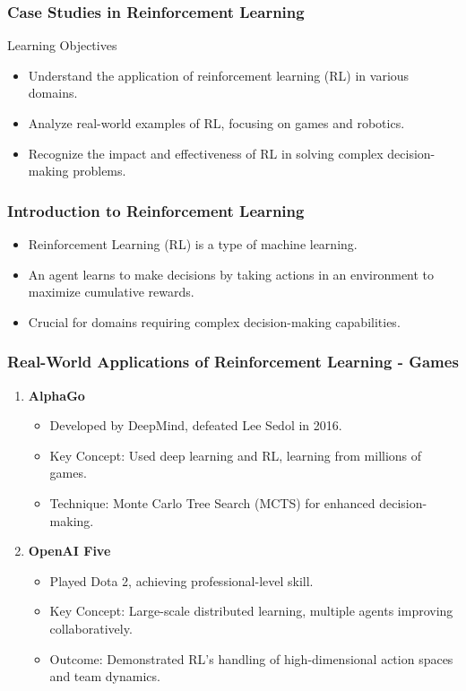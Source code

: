 \documentclass[aspectratio=169]{beamer}
\begin{document}
\begin{frame}[fragile]
    \frametitle{Case Studies in Reinforcement Learning}
    \begin{block}{Learning Objectives}
        \begin{itemize}
            \item Understand the application of reinforcement learning (RL) in various domains.
            \item Analyze real-world examples of RL, focusing on games and robotics.
            \item Recognize the impact and effectiveness of RL in solving complex decision-making problems.
        \end{itemize}
    \end{block}
\end{frame}

\begin{frame}[fragile]
    \frametitle{Introduction to Reinforcement Learning}
    \begin{itemize}
        \item Reinforcement Learning (RL) is a type of machine learning.
        \item An agent learns to make decisions by taking actions in an environment to maximize cumulative rewards.
        \item Crucial for domains requiring complex decision-making capabilities.
    \end{itemize}
\end{frame}

\begin{frame}[fragile]
    \frametitle{Real-World Applications of Reinforcement Learning - Games}
    \begin{enumerate}
        \item \textbf{AlphaGo}
        \begin{itemize}
            \item Developed by DeepMind, defeated Lee Sedol in 2016.
            \item Key Concept: Used deep learning and RL, learning from millions of games.
            \item Technique: Monte Carlo Tree Search (MCTS) for enhanced decision-making.
        \end{itemize}

        \item \textbf{OpenAI Five}
        \begin{itemize}
            \item Played Dota 2, achieving professional-level skill.
            \item Key Concept: Large-scale distributed learning, multiple agents improving collaboratively.
            \item Outcome: Demonstrated RL’s handling of high-dimensional action spaces and team dynamics.
        \end{itemize}
    \end{enumerate}
\end{frame}
\end{document}
